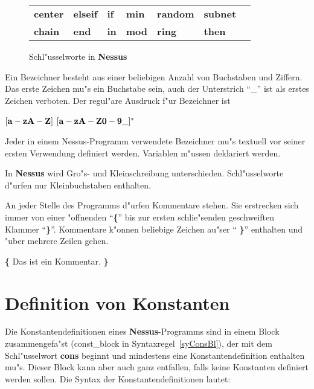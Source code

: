\begin{figure}[htb]
\begin{center}
{\begin{minipage}{\textwidth}
\begin{center}
\begin{tabular}{lllllll}
  {\bf center}\index{center}    & {\bf elseif}\index{elseif}  & {\bf if}\index{if}           & {\bf min}\index{min}   
& {\bf random}\index{random}    & {\bf subnet}\index{subnet} \\

  {\bf chain}\index{chain}      & {\bf end}\index{end}        & {\bf in}\index{in}           & {\bf mod}\index{mod}  
& {\bf ring}\index{ring}        & {\bf then}\index{then} \\

\end{tabular}
\end{center}                         
\end{minipage}
}
\caption{\label{SchlWorte} Schl"usselworte in {\bf Nessus}}
\end{center}
\end{figure}

Ein Bezeichner besteht aus einer beliebigen Anzahl
von Buchstaben und Ziffern. Das erste Zeichen mu"s
ein Buchstabe sein, auch der Unterstrich ``\_'' ist als erstes Zeichen
verboten. Der regul"are Ausdruck f"ur Bezeichner ist\\ \centerline{
${\bf [a-zA-Z]}$ ${\bf [a-zA-Z0-9\_]^*}$} Jeder in einem
Nessus-Programm verwendete Bezeichner mu"s textuell
vor seiner ersten Verwendung definiert werden.
Variablen m"ussen deklariert werden.

In {\bf Nessus} wird Gro"s- und Kleinschreibung unterschieden.
Schl"usselworte d"urfen nur Kleinbuchstaben enthalten.

\label{Kommentar} 

An jeder Stelle des Programms d"urfen Kommentare
stehen. Sie erstrecken sich immer von einer "offnenden ``{\bf \{}''
bis zur ersten schlie"senden geschweiften
Klammer ``{\bf \}}''.
Kommentare k"onnen beliebige Zeichen au"ser ``{\bf
\}}'' enthalten und "uber mehrere Zeilen gehen.

\centerline{\small {\bf \{} Das ist ein Kommentar. {\bf \}}}


\section{Definition von Konstanten}

Die Konstantendefinitionen eines {\bf
Nessus}-Programms sind in einem Block zusammengefa"st (const\_block in
Syntaxregel~\ref{syConsBl}), der mit dem Schl"usselwort {\bf
cons} beginnt und mindestens eine Konstantendefinition
 enthalten mu"s.  Dieser Block kann aber
auch ganz entfallen, falls keine Konstanten definiert werden sollen.
Die Syntax der Konstantendefinitionen
 lautet:

